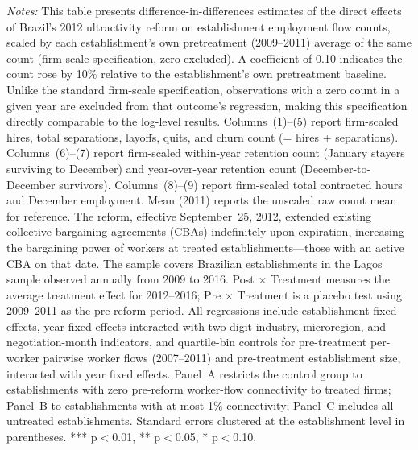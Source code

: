 \documentclass[12pt,letterpaper]{article}
\begin{document}
\begin{table}[]
\begin{threeparttable}
\begin{tablenotes}
\item \textit{Notes:} This table presents difference-in-differences estimates of the direct effects of Brazil's 2012 ultractivity reform on establishment employment flow counts, scaled by each establishment's own pretreatment (2009--2011) average of the same count (firm-scale specification, zero-excluded). A coefficient of 0.10 indicates the count rose by 10\% relative to the establishment's own pretreatment baseline. Unlike the standard firm-scale specification, observations with a zero count in a given year are excluded from that outcome's regression, making this specification directly comparable to the log-level results. Columns~(1)--(5) report firm-scaled hires, total separations, layoffs, quits, and churn count (= hires + separations). Columns~(6)--(7) report firm-scaled within-year retention count (January stayers surviving to December) and year-over-year retention count (December-to-December survivors). Columns~(8)--(9) report firm-scaled total contracted hours and December employment. Mean (2011) reports the unscaled raw count mean for reference. The reform, effective September~25, 2012, extended existing collective bargaining agreements (CBAs) indefinitely upon expiration, increasing the bargaining power of workers at treated establishments---those with an active CBA on that date. The sample covers Brazilian establishments in the Lagos sample observed annually from 2009 to 2016. Post $\times$ Treatment measures the average treatment effect for 2012--2016; Pre $\times$ Treatment is a placebo test using 2009--2011 as the pre-reform period. All regressions include establishment fixed effects, year fixed effects interacted with two-digit industry, microregion, and negotiation-month indicators, and quartile-bin controls for pre-treatment per-worker pairwise worker flows (2007--2011) and pre-treatment establishment size, interacted with year fixed effects. Panel~A restricts the control group to establishments with zero pre-reform worker-flow connectivity to treated firms; Panel~B to establishments with at most 1\% connectivity; Panel~C includes all untreated establishments. Standard errors clustered at the establishment level in parentheses. *** p$<$0.01, ** p$<$0.05, * p$<$0.10.
\end{tablenotes}
\end{threeparttable}
\end{table}

\clearpage
\end{document}
